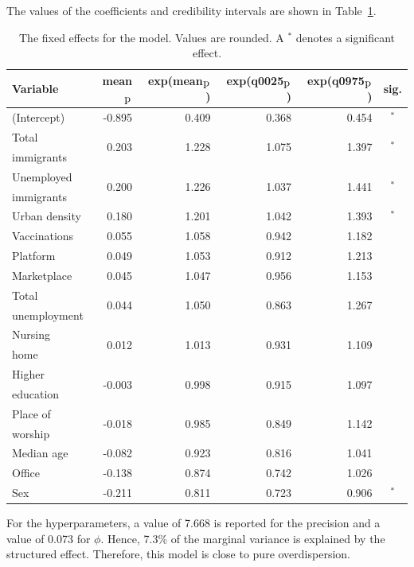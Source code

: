 The values of the coefficients and credibility intervals are shown in Table~\ref{fixedAllNorway_spatial}.
\begin{table}[H]
\caption{The fixed effects for the model. Values are rounded. A $^*$ denotes a significant effect. \label{fixedAllNorway_spatial}}
\begin{tabular}{l r r r r c}
\toprule
\textbf{Variable}	& \textbf{mean$_{\hbox{p}}$}	& \textbf{exp(mean$_{\hbox{p}}$)} & \textbf{exp(q0025$_{\hbox{p}}$)} & \textbf{exp(q0975$_{\hbox{p}}$)} & \textbf{sig.}\\
\midrule
(Intercept) & -0.895 & 0.409 & 0.368 & 0.454 & $^*$ \\
Total & \multirow{2}{*}{0.203}& \multirow{2}{*}{1.228}& \multirow{2}{*}{1.075}& \multirow{2}{*}{1.397}& \multirow{2}{*}{$^*$}\\
immigrants \\
Unemployed & \multirow{2}{*}{0.200} & \multirow{2}{*}{1.226} & \multirow{2}{*}{1.037} & \multirow{2}{*}{1.441} & \multirow{2}{*}{$^*$} \\
immigrants\\
Urban density & 0.180 & 1.201 & 1.042 & 1.393 & $^*$ \\
Vaccinations & 0.055 & 1.058 & 0.942 & 1.182\\
Platform & 0.049 & 1.053 & 0.912 & 1.213\\
Marketplace & 0.045 & 1.047 & 0.956 & 1.153 \\
Total & \multirow{2}{*}{0.044}& \multirow{2}{*}{1.050}& \multirow{2}{*}{0.863}& \multirow{2}{*}{1.267}\\
unemployment \\
Nursing & \multirow{2}{*}{0.012} & \multirow{2}{*}{1.013} & \multirow{2}{*}{0.931} & \multirow{2}{*}{1.109} \\
home\\
Higher & \multirow{2}{*}{-0.003}& \multirow{2}{*}{0.998}& \multirow{2}{*}{0.915}& \multirow{2}{*}{1.097}\\ 
education \\
Place of & \multirow{2}{*}{-0.018}& \multirow{2}{*}{0.985}& \multirow{2}{*}{0.849}& \multirow{2}{*}{1.142} \\
worship \\
Median age& -0.082 & 0.923 & 0.816 & 1.041 \\
Office & -0.138 & 0.874 & 0.742 & 1.026 \\
Sex & -0.211 & 0.811 & 0.723 & 0.906 & $^*$ \\
\bottomrule
\end{tabular}
\end{table}
For the hyperparameters, a value of 7.668 is reported for the precision and a value of 0.073 for $\phi$. Hence, 7.3\% of the marginal variance is explained by the structured effect. Therefore, this model is close to pure overdispersion.
\clearpage
